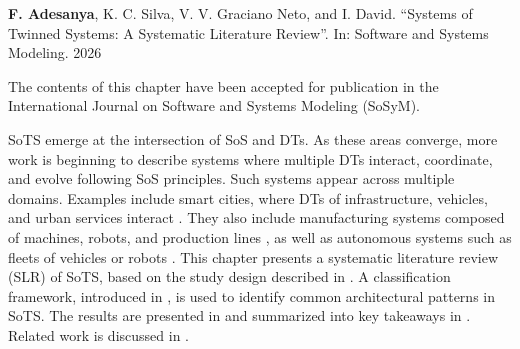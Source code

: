 \begin{publicationbox}{\resizebox{0.5cm}{!}{\faFileText}}
    \textbf{F. Adesanya}, K. C. Silva, V. V. Graciano Neto, and I. David. ``Systems of Twinned Systems: A Systematic Literature Review''. In: Software and Systems Modeling. 2026

    \tcblower
    
    The contents of this chapter have been accepted for publication in the International Journal on Software and Systems Modeling (SoSyM).
\end{publicationbox}

SoTS emerge at the intersection of SoS and DTs. As these areas converge, more work is beginning to describe systems where multiple DTs interact, coordinate, and evolve following SoS principles. Such systems appear across multiple domains. Examples include smart cities, where DTs of infrastructure, vehicles, and urban services interact \cite{human2023design,somma2023digital}. 
They also include manufacturing systems composed of machines, robots, and production lines \cite{gill2022method,gollner2022collaborative}, as well as autonomous systems such as fleets of vehicles or robots \cite{barden2022academic,novak2022digitalized}. This chapter presents a systematic literature review (SLR) of SoTS, based on the study design described in . A classification framework, introduced in , is used to identify common architectural patterns in SoTS. The results are presented in  and summarized into key takeaways in . Related work is discussed in .
